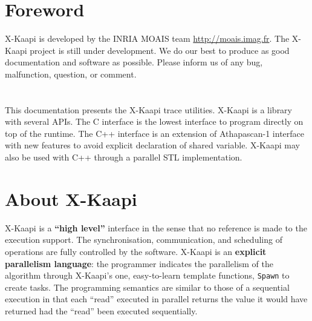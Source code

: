 \documentclass{article}[12pt]
\newcommand{\kaapi}{\textsc{X}-Kaapi\xspace}
\begin{document}
\RRtitle{\kaapi Tracing Tool}
\RRabstract{}
\RRresume{}
\RRmotcle{}
\RRkeyword{}
\RCGrenoble
\RRNo{}

\makeRT %

\newpage
\tableofcontents
\newpage

\section*{Foreword}

\kaapi is developed by the INRIA MOAIS team \url{http://moais.imag.fr}.
The \kaapi project is still under development.  We do our best to produce as
good documentation and  software as possible.  
Please inform us of any bug, malfunction, question, or comment. \\ 
~\\
~\\
This documentation presents the \kaapi trace utilities. \kaapi is a library with several APIs. 
The C interface is the lowest interface to program directly on top of the
runtime. The C++ interface is an extension of Athapascan-1 interface with new
features to avoid explicit declaration of shared variable.
\kaapi may also be used with C++ through a parallel STL implementation.

\section*{About \kaapi}

\kaapi  is a \textbf{``high level''}  interface in the sense that no reference is made to the execution support.  
The synchronisation, communication, and scheduling of operations are fully controlled by the software. 
   \kaapi is an  \textbf{explicit parallelism language}: the programmer indicates the parallelism of the algorithm through \kaapi's one, easy-to-learn  template functions, \texttt{Spawn} to create tasks.   The programming semantics are similar to those of a sequential 
 execution in that each ``read'' executed in parallel returns the value it would have returned had the ``read'' been executed  sequentially. 
 
\end{document}

